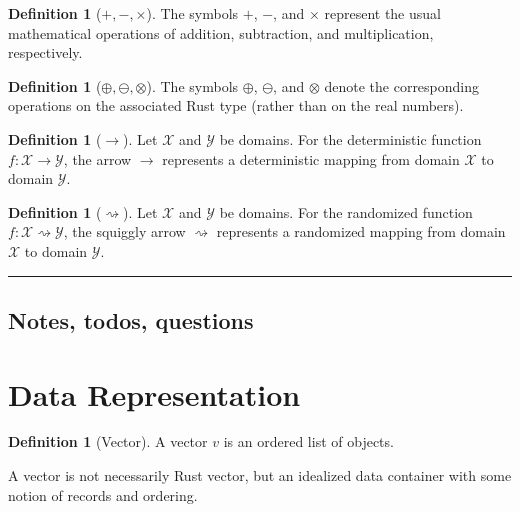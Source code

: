 \documentclass[11pt,a4paper]{article}
\theoremstyle{definition}
\newtheorem{definition}[theorem]{Definition}
\newcommand{\horizline}{\noindent\rule{\textwidth}{1pt}}
\begin{document}
\begin{definition}[$+, -, \times$]
    The symbols $+$, $-$, and $\times$ represent the usual mathematical operations of addition, subtraction, and multiplication, respectively.
\end{definition}

\begin{definition}[$\oplus, \ominus, \otimes$]
    The symbols $\oplus$, $\ominus$, and $\otimes$ denote the corresponding operations on the associated Rust type (rather than on the real numbers).
\end{definition}

\begin{definition}[$\rightarrow$]
    Let $\mathcal{X}$ and $\mathcal{Y}$ be domains. For the deterministic function $f:\mathcal{X}\rightarrow\mathcal{Y}$, the arrow $\rightarrow$ represents a deterministic mapping from domain $\mathcal{X}$ to domain $\mathcal{Y}$.
\end{definition}

\begin{definition}[$\rightsquigarrow$]
    Let $\mathcal{X}$ and $\mathcal{Y}$ be domains. For the randomized function $f:\mathcal{X}\rightsquigarrow\mathcal{Y}$, the squiggly arrow $\rightsquigarrow$ represents a randomized mapping from domain $\mathcal{X}$ to domain $\mathcal{Y}$.
\end{definition}


\horizline

\subsection{Notes, todos, questions}

\section{Data Representation}

\begin{definition}[Vector]
A vector $v$ is an ordered list of objects.
\end{definition}

A vector is not necessarily Rust vector, but an idealized data container with some notion of records and ordering.
\end{document}
